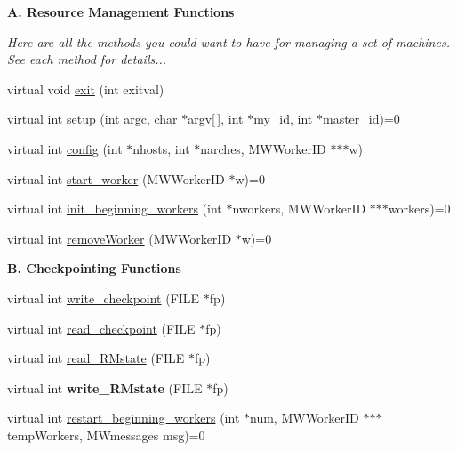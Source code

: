 \begin{Indent}\textbf{ A. Resource Management Functions}\par
{\em Here are all the methods you could want to have for managing a set of machines. See each method for details... }\begin{DoxyCompactItemize}
\item 
virtual void \hyperlink{classMWRMComm_ab4ce8dae654516f77d20fc912da3e188}{exit} (int exitval)
\item 
virtual int \hyperlink{classMWRMComm_a6c500b03f49fbab5a879dfec1f8c492e}{setup} (int argc, char $\ast$argv\mbox{[}$\,$\mbox{]}, int $\ast$my\+\_\+id, int $\ast$master\+\_\+id)=0
\item 
virtual int \hyperlink{classMWRMComm_a14c2e55899e741afad81df95f33afa5d}{config} (int $\ast$nhosts, int $\ast$narches, M\+W\+Worker\+ID $\ast$$\ast$$\ast$w)
\item 
virtual int \hyperlink{classMWRMComm_a0064a409542e4308c77eb598b161138e}{start\+\_\+worker} (M\+W\+Worker\+ID $\ast$w)=0
\item 
virtual int \hyperlink{classMWRMComm_a50088a80976b2aee031e987393bceeb2}{init\+\_\+beginning\+\_\+workers} (int $\ast$nworkers, M\+W\+Worker\+ID $\ast$$\ast$$\ast$workers)=0
\item 
virtual int \hyperlink{classMWRMComm_a532c61bca2f954df18a46fb4f1578606}{remove\+Worker} (M\+W\+Worker\+ID $\ast$w)=0
\end{DoxyCompactItemize}
\end{Indent}
\begin{Indent}\textbf{ B. Checkpointing Functions}\par
\begin{DoxyCompactItemize}
\item 
virtual int \hyperlink{classMWRMComm_a497ab814d1bc00c8fa562e85c2fd6570}{write\+\_\+checkpoint} (F\+I\+LE $\ast$fp)
\item 
virtual int \hyperlink{classMWRMComm_ac04df4ffaa419034cf0ee335cd932dcd}{read\+\_\+checkpoint} (F\+I\+LE $\ast$fp)
\item 
virtual int \hyperlink{classMWRMComm_afeb6975c08febef60274b552090fdc95}{read\+\_\+\+R\+Mstate} (F\+I\+LE $\ast$fp)
\item 
\mbox{\label{classMWRMComm_a7570e146ed6b1c42a20fa015ddc1b823}} 
virtual int {\bfseries write\+\_\+\+R\+Mstate} (F\+I\+LE $\ast$fp)
\item 
virtual int \hyperlink{classMWRMComm_a831a7994d307d075f877b4415cb65657}{restart\+\_\+beginning\+\_\+workers} (int $\ast$num, M\+W\+Worker\+ID $\ast$$\ast$$\ast$temp\+Workers, M\+Wmessages msg)=0
\end{DoxyCompactItemize}
\end{Indent}
